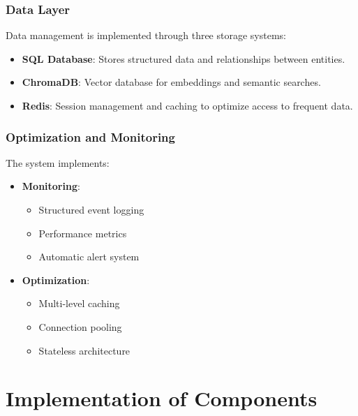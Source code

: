 \subsubsection{Data Layer}
\label{capa-datos}

Data management is implemented through three storage systems:

\begin{itemize}
    \item \textbf{SQL Database}: Stores structured data and relationships between entities.
    
    \item \textbf{ChromaDB}: Vector database for embeddings and semantic searches.
    
    \item \textbf{Redis}: Session management and caching to optimize access to frequent data.
\end{itemize}

\subsubsection{Optimization and Monitoring}
\label{optimizacion-monitoreo}

The system implements:

\begin{itemize}
    \item \textbf{Monitoring}:
    \begin{itemize}
        \item Structured event logging
        \item Performance metrics
        \item Automatic alert system
    \end{itemize}

    \item \textbf{Optimization}:
    \begin{itemize}
        \item Multi-level caching
        \item Connection pooling
        \item Stateless architecture
    \end{itemize}
\end{itemize}


\section{Implementation of Components}
\label{implementacion-componentes}


